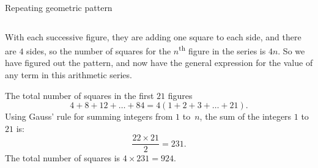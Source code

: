 \documentclass[9pt,aspectratio=169]{beamer}
\begin{document}
\begin{frame}{Repeating geometric pattern}
\begin{columns}[T]
\begin{column}{0.5\textwidth}
      With each successive figure, they are adding one square to each side, and there are $4$ sides, so the number of squares for the $n$\textsuperscript{th} figure in the series is $4n$.  So we have figured out the pattern, and now have the general expression for the value of any term in this arithmetic series.

      The total number of squares in the first $21$ figures
      \[ 4 + 8 + 12 + \ldots + 84 = 4 \left(1 + 2 + 3 + \ldots + 21\right). \]
      Using Gauss' rule for summing integers from $1$ 
      to~$n$, the sum of the integers $1$ to $21$ is:
      \[ \frac{22 \times 21}{2} = 231. \]
      The total number of squares is $4 \times 231 = 924.$

    \end{column}
  \end{columns}
\end{frame}
\end{document}
